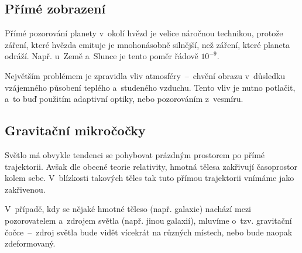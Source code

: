 \documentclass[a4paper,12pt]{article}
\begin{document}
{{{
\drawgimp[2]

\subsection{Přímé zobrazení}


Přímé pozorování planety v~okolí hvězd je velice náročnou technikou, protože záření, které hvězda emituje je mnohonásobně silnější, než záření, které planeta odráží. Např. u~Země a~Slunce je tento poměr řádově $10^{-9}$.~\cite{methods}

Největším problémem je zpravidla vliv atmosféry~--~chvění obrazu v~důsledku vzájemného působení teplého a~studeného vzduchu. Tento vliv je nutno potlačit, a~to buď použitím adaptivní optiky, nebo pozorováním z~vesmíru.~\cite{methods}


\vspace{-10pt}
\subsection{Gravitační mikročočky}

Světlo má obvykle tendenci se pohybovat prázdným prostorem po přímé trajektorii. Avšak dle obecné teorie relativity, hmotná tělesa zakřivují časoprostor kolem sebe. V~blízkosti takových těles tak tuto přímou trajektorii vnímáme jako zakřivenou.~\cite{methods}


{}

V~případě, kdy se nějaké hmotné těleso (např. galaxie) nachází mezi pozorovatelem a~zdrojem světla (např. jinou galaxií), mluvíme o~tzv. gravitační čočce~--~zdroj světla bude vidět vícekrát na různých místech, nebo bude naopak zdeformovaný.~\cite{methods}

}}}
\end{document}
